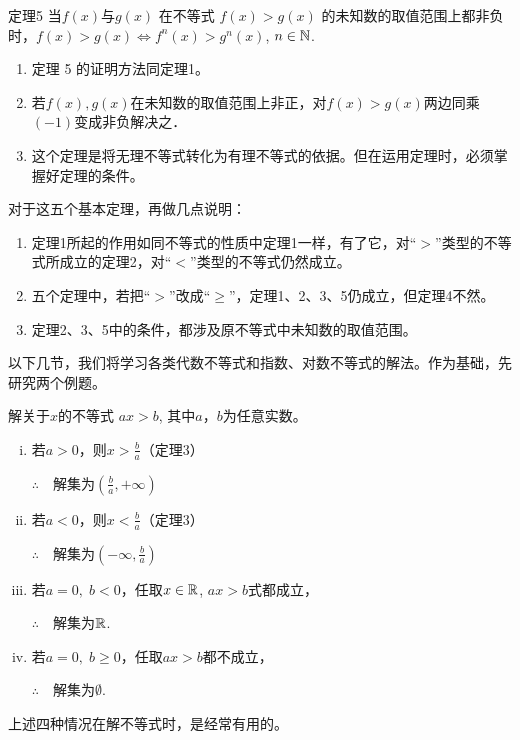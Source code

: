 \begin{thm}{定理5 }
 当$f(x)$与$g(x)$ 在不等式 $f(x)>g(x)$ 的未知数的取值范围上都非负时，$f(x)>g(x)\Longleftrightarrow f^n(x)>g^n(x)$, $n\in \mathbb{N}$.   
\end{thm}

\begin{note}
\begin{enumerate}[(1)]
    \item 定理 5 的证明方法同定理1。
\item 若$f(x), g(x)$在未知数的取值范围上非正，对$f(x)>g(x)$两边同乘$(-1)$变成非负解决之．
\item 这个定理是将无理不等式转化为有理不等式的依据。但在运用定理时，必须掌握好定理的条件。
\end{enumerate} 
\end{note}


    对于这五个基本定理，再做几点说明：
\begin{enumerate}[(1)]
\item 定理1所起的作用如同不等式的性质中定理1一样，有了它，对“$>$”类型的不等式所成立的定理2，对“$<$”类型的不等式仍然成立。
\item 五个定理中，若把“$>$”改成“$\ge $”，定理1、2、3、5仍成立，但定理4不然。
\item 定理2、3、5中的条件，都涉及原不等式中未知数的取值范围。
\end{enumerate}

    以下几节，我们将学习各类代数不等式和指数、对数不等式的解法。作为基础，先研究两个例题。

\begin{example}
    解关于$x$的不等式
$ax>b$, 
其中$a$，$b$为任意实数。
\end{example}

\begin{solution}
\begin{enumerate}[(i)]
    \item 若$a>0$，则$x>\frac{b}{a}$\hfill（定理3）

    $\therefore\quad $解集为$\left(\frac{b}{a},+\infty\right)$
\item 若$a<0$，则$x<\frac{b}{a}$\hfill（定理3）

$\therefore\quad $解集为$\left(-\infty, \frac{b}{a}\right)$
\item 若$a=0,\; b<0$，任取$x\in\mathbb{R}$, $ax>b$式都成立，

$\therefore\quad $解集为$\mathbb{R}$.
\item 若$a=0,\; b\ge 0$，任取$ax>b$都不成立，

$\therefore\quad $解集为$\emptyset$.
\end{enumerate}
上述四种情况在解不等式时，是经常有用的。
\end{solution}

